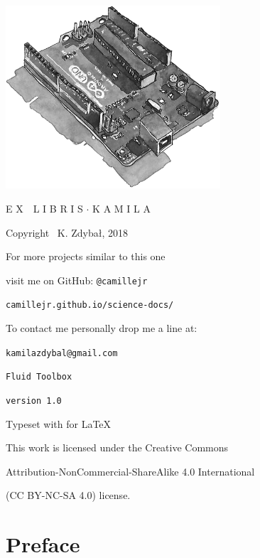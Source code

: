 \documentclass[10pt]{report}
\begin{document}
\thispagestyle{empty}
\begin{center}
\vspace*{3cm}
\includegraphics[width = 80mm]{ex_libris_arduino.jpg}

\vspace*{1cm}

{\fontsize{18}{10}\selectfont {}\selectfont E X \,\, L I B R I S $\cdotp$ K A M I L A}

\vspace*{2cm}

Copyright \textcopyright \, K. Zdybał, 2018

For more projects similar to this one

visit me on GitHub: \verb|@camillejr|

\verb|camillejr.github.io/science-docs/|

To contact me personally drop me a line at:

\verb|kamilazdybal@gmail.com|

\vspace*{2cm}

\verb|Fluid Toolbox|

\verb|version 1.0|

Typeset with  for \LaTeX

\vspace*{1.8cm}

\noindent This work is licensed under the Creative Commons

Attribution-NonCommercial-ShareAlike 4.0 International 

(CC BY-NC-SA
4.0) license.
\end{center}

\setlength{\parskip}{0.6em}
\setlength{\parindent}{0cm}

\tableofcontents
\chapter*{Preface}
\thispagestyle{empty}
\end{document}
